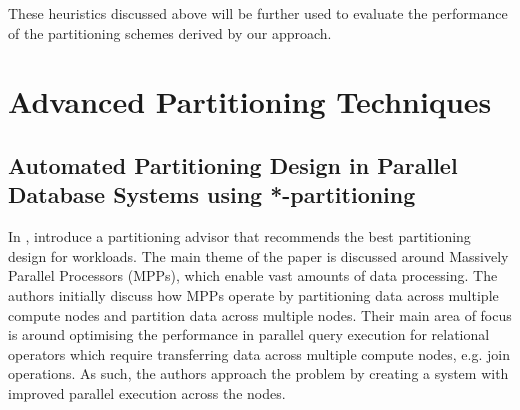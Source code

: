 These heuristics discussed above will be further used to evaluate the performance of the partitioning schemes derived by our approach. 

\section{Advanced Partitioning Techniques}
\label{sec:adv-part-techniques}
\subsection{Automated Partitioning Design in Parallel Database Systems using *-partitioning}

In \cite{DBLP:conf/sigmod/NehmeB11}, \citeauthor{DBLP:conf/sigmod/NehmeB11} introduce a partitioning advisor that recommends the best partitioning design for workloads. The main theme of the paper is discussed around Massively Parallel Processors (MPPs), which enable vast amounts of data processing. The authors initially discuss how MPPs operate by partitioning data across multiple compute nodes and partition data across multiple nodes. Their main area of focus is around optimising the performance in parallel query execution for relational operators which require transferring data across multiple compute nodes, e.g. join operations. As such, the authors approach the problem by creating a system with improved parallel execution across the nodes.

